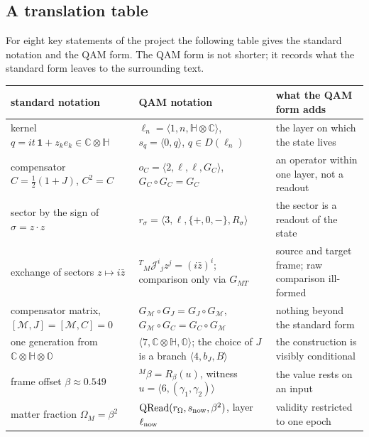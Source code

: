 \subsection{A translation table}

For eight key statements of the project the following table gives the standard notation and the QAM form.  The QAM form is not shorter;
it records what the standard form leaves to the surrounding text.

\begin{center}
\small
\renewcommand{\arraystretch}{1.3}
\begin{longtable}{@{}>{\raggedright\arraybackslash}p{}>{\raggedright\arraybackslash}p{}>{\raggedright\arraybackslash}p{}@{}}
\toprule
standard notation & QAM notation & what the QAM form adds\\
\midrule
\endhead
kernel \(q=it\,\mathbf 1+z_ke_k\in\mathbb C\otimes\mathbb H\) & \(\ell_n=\langle1,n,\mathbb H\otimes\mathbb C\rangle\), \(s_q=\langle0,q\rangle\), \(q\in D(\ell_n)\) & the layer on which the
state lives\\
compensator \(C=\tfrac12(1+J)\), \(C^2=C\) & \(o_C=\langle2,\ell,\ell,G_C\rangle\), \(G_C\circ G_C=G_C\) & an operator within one layer, not a readout\\
sector by the sign of \(\sigma=z\cdot z\) & \(r_\sigma=\langle3,\ell,\{+,0,-\},R_\sigma\rangle\) & the sector is a readout of the state\\
exchange of sectors \(z\mapsto i\bar z\) & \({}^{T}{}_{M}\mathcal J^{i}{}_{j}z^j=(i\bar z)^i\); comparison only via \(G_{MT}\) & source and target frame; raw
comparison ill-formed\\
compensator matrix, \([\mathcal M,J]=[\mathcal M,C]=0\) & \(G_{\mathcal M}\circ G_J=G_J\circ G_{\mathcal M}\), \(G_{\mathcal M}\circ G_C=G_C\circ G_{\mathcal M}\) & nothing beyond
the standard form\\
one generation from \(\mathbb C\otimes\mathbb H\otimes\mathbb O\) & \(\langle7,\mathbb C\otimes\mathbb H,\mathbb O\rangle\); the choice of \(J\) is a branch \(\langle4,b_J,B\rangle\) & the construction is
visibly conditional\\
frame offset \(\beta\approx0.549\) & \({}^{M}\beta=R_\beta(u)\), witness \(u=\langle6,(\gamma_1,\gamma_2)\rangle\) & the value rests on an input\\
matter fraction \(\Omega_M=\beta^2\) & \(\mathrm{QRead}(r_\Omega,s_{\rm now},\beta^2)\), layer \(\ell_{\rm now}\) & validity restricted to one epoch\\
\bottomrule
\end{longtable}
\end{center}
